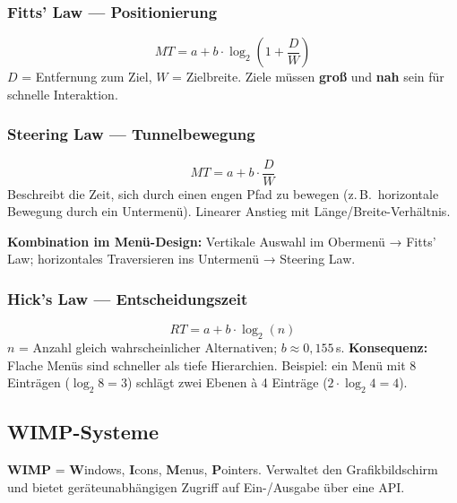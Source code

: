\documentclass[12pt, a4paper]{article}
\begin{document}
\subsubsection*{Fitts' Law — Positionierung}

\[
  MT = a + b \cdot \log_2\!\left(1 + \frac{D}{W}\right)
\]
$D$ = Entfernung zum Ziel, $W$ = Zielbreite. Ziele müssen \textbf{groß} und \textbf{nah} sein für schnelle Interaktion.

\subsubsection*{Steering Law — Tunnelbewegung}

\[
  MT = a + b \cdot \frac{D}{W}
\]
Beschreibt die Zeit, sich durch einen engen Pfad zu bewegen (z.\,B.\ horizontale Bewegung durch ein Untermenü). Linearer Anstieg mit Länge/Breite-Verhältnis.

\textbf{Kombination im Menü-Design:} Vertikale Auswahl im Obermenü → Fitts' Law; horizontales Traversieren ins Untermenü → Steering Law.

\subsubsection*{Hick's Law — Entscheidungszeit}

\[
  RT = a + b \cdot \log_2(n)
\]
$n$ = Anzahl gleich wahrscheinlicher Alternativen; $b \approx 0{,}155\,$s. \textbf{Konsequenz:} Flache Menüs sind schneller als tiefe Hierarchien. Beispiel: ein Menü mit 8 Einträgen ($\log_2 8 = 3$) schlägt zwei Ebenen à 4 Einträge ($2 \cdot \log_2 4 = 4$).

\subsection{WIMP-Systeme}

\textbf{WIMP} = \textbf{W}indows, \textbf{I}cons, \textbf{M}enus, \textbf{P}ointers. Verwaltet den Grafikbildschirm und bietet geräteunabhängigen Zugriff auf Ein-/Ausgabe über eine API.
\end{document}
